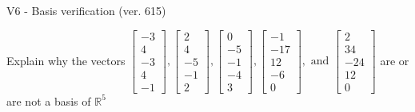 \begin{exercise}
  \begin{exerciseTitle}V6 - Basis verification (ver. 615)\end{exerciseTitle}
  \begin{exerciseStatement}
    Explain why the vectors \(\left[\begin{array}{r}
-3 \\
4 \\
-3 \\
4 \\
-1
\end{array}\right] , \left[\begin{array}{r}
2 \\
4 \\
-5 \\
-1 \\
2
\end{array}\right] , \left[\begin{array}{r}
0 \\
-5 \\
-1 \\
-4 \\
3
\end{array}\right] , \left[\begin{array}{r}
-1 \\
-17 \\
12 \\
-6 \\
0
\end{array}\right] , \text{ and } \left[\begin{array}{r}
2 \\
34 \\
-24 \\
12 \\
0
\end{array}\right]\) are or are not a basis of \(\mathbb{R}^5\)	



\end{exerciseStatement}
\end{exercise}
